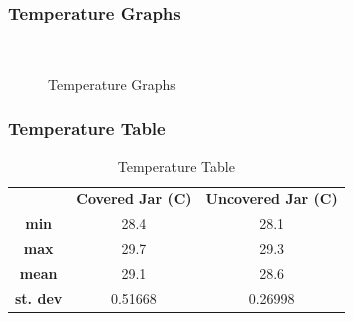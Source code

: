 \documentclass[a4paper, 12pt, english]{article}
\begin{document}
\subsubsection{Temperature Graphs}
\begin{figure}[H]
	\centering
	\\
	\qquad
	\qquad
	\caption{Temperature Graphs}
	\label{fig:TempGraphs}
\end{figure}

\subsubsection{Temperature Table}

\begin{table}[H]
	\caption{\label{tab:Table 1} Temperature Table}
	\centering
	\begin{tabular}{c c c}
		\toprule
		                 & \textbf{Covered Jar (\degree C)}
		                 & \textbf{Uncovered Jar (\degree C)}           \\
		\cmidrule[0.4pt](r{0.125em}){1-1}%
		\cmidrule[0.4pt](lr{0.125em}){2-2}%
		\cmidrule[0.4pt](lr{0.125em}){3-3}%
		\textbf{min}     & 28.4                               & 28.1    \\
		\textbf{max}     & 29.7                               & 29.3    \\
		\textbf{mean}    & 29.1                               & 28.6    \\
		\textbf{st. dev} & 0.51668                            & 0.26998
	\end{tabular}
\end{table}
\end{document}
